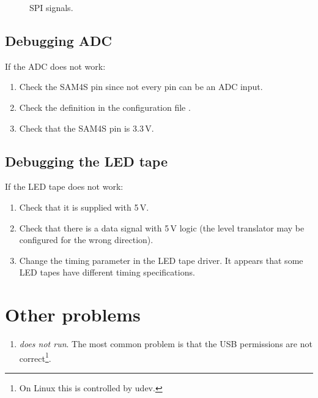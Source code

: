 \begin{enumerate}
\begin{figure}[!h]
  \centering
  \caption{SPI signals.}
\end{figure}


\subsection{Debugging ADC}
\label{debugging-adc}

If the ADC does not work:
%
\begin{enumerate}
\item
  Check the SAM4S pin since not every pin can be an ADC input.

\item
  Check the definition in the configuration file .

\item
  Check that the SAM4S  pin is 3.3\,V.

\end{enumerate}


\subsection{Debugging the LED tape}

If the LED tape does not work:
%
\begin{enumerate}
\item Check that it is supplied with 5\,V.

\item Check that there is a data signal with 5\,V logic (the level
  translator may be configured for the wrong direction).

\item Change the timing parameter in the LED tape driver.  It appears
  that some LED tapes have different timing specifications.
\end{enumerate}



\section{Other problems}
\label{faq}

\begin{enumerate}
\item
  \emph{ does not run}. The most common problem is
  that the USB permissions are not correct\footnote{On Linux this is
    controlled by udev.}.


\end{enumerate}
\end{enumerate}
